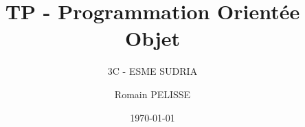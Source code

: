 \documentclass[handout]{beamer}
\title{TP - Programmation Orientée Objet}
\subtitle{3C - ESME SUDRIA}
\author{Romain PELISSE}
\institute{\texttt{[image: ../img/logo-cc.png]}}
\date{\today}
\begin{document}
	\begin{frame}
		\titlepage
	\end{frame}
	
\end{document}
